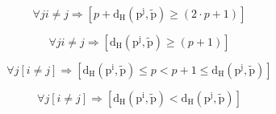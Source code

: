 \begin{enumerate}
\begin{enumerate}
\begin{enumerate}
\begin{enumerate}
        \[\forall j{i \neq j}\Rightarrow\left\lbrack {{p + \mathtt{\mathrm{d_{H}}}}{\left( {\mathtt{\mathrm{p^{j}}},\mathtt{\mathrm{\widetilde{p}}}} \right) \geq \left( {{2 \cdot p} + 1} \right)}} \right\rbrack\]

        \[\forall j{i \neq j}\Rightarrow\left\lbrack {\mathtt{\mathrm{d_{H}}}{\left( {\mathtt{\mathrm{p^{j}}},\mathtt{\mathrm{\widetilde{p}}}} \right) \geq \left( {p + 1} \right)}} \right\rbrack\]

        \[\forall j\left\lbrack {i \neq j} \right\rbrack\Rightarrow\left\lbrack {\mathtt{\mathrm{d_{H}}}{{{\left( {\mathtt{\mathrm{p^{i}}},\mathtt{\mathrm{\widetilde{p}}}} \right) \leq p} < {p + 1}} \leq \mathtt{\mathrm{d_{H}}}}\left( {\mathtt{\mathrm{p^{j}}},\mathtt{\mathrm{\widetilde{p}}}} \right)} \right\rbrack\]

        \[\forall j\left\lbrack {i \neq j} \right\rbrack\Rightarrow\left\lbrack {\mathtt{\mathrm{d_{H}}}{\left( {\mathtt{\mathrm{p^{i}}},\mathtt{\mathrm{\widetilde{p}}}} \right) < \mathtt{\mathrm{d_{H}}}}\left( {\mathtt{\mathrm{p^{j}}},\mathtt{\mathrm{\widetilde{p}}}} \right)} \right\rbrack\]


\end{enumerate}
\end{enumerate}
\end{enumerate}
\end{enumerate}
